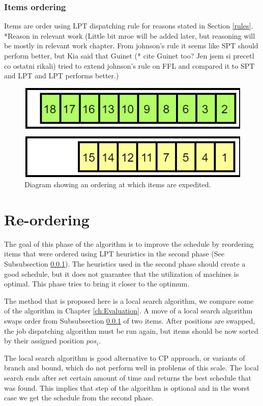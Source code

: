\documentclass{ctuthesis}
\begin{document}
\subsubsection{Items ordering}
\label{subsubsec:itemsordering}

Items are order using LPT dispatching rule for reasons stated in Section \ref{rules}. *Reason in relevant work (Little bit mroe will be added later, but reasoning will be mostly in relevant work chapter. From johnson's rule it seems like SPT should perform better, but Kia \cite{kia} said that Guinet (* cite Guinet too? Jen jsem si precetl co ostatni rikali) tried to extend johnson's rule on FFL and compared it to SPT and LPT and LPT performs better.)


\begin{figure}[h]
\includegraphics[width=0.8\linewidth]{order.jpg}
\caption{Diagram showing an ordering at which items are expedited.}
\label{order}
\end{figure}

\section{Re-ordering}

The goal of this phase of the algorithm is to improve the schedule by reordering items that were ordered using LPT heuristics in the second phase (See Subsubsection \ref{subsubsec:itemsordering}). The heuristics used in the second phase should create a good schedule, but it does not guarantee that the utilization of machines is optimal. This phase tries to bring it closer to the optimum.

The method that is proposed here is a local search algorithm, we compare some of the algorithm in Chapter \ref{ch:Evaluation}. A move of a local search algorithm swaps order from Subsubsection \ref{subsubsec:itemsordering} of two items. After positions are swapped, the job dispatching algorithm must be run again, but items should be now sorted by their assigned position $pos_i$.

The local search algorithm is good alternative to CP approach, or variants of branch and bound, which do not perform well in problems of this scale. The local search ends after set certain amount of time and returns the best schedule that was found. This implies that step of the algorithm is optional and in the worst case we get the schedule from the second phase.
\end{document}

